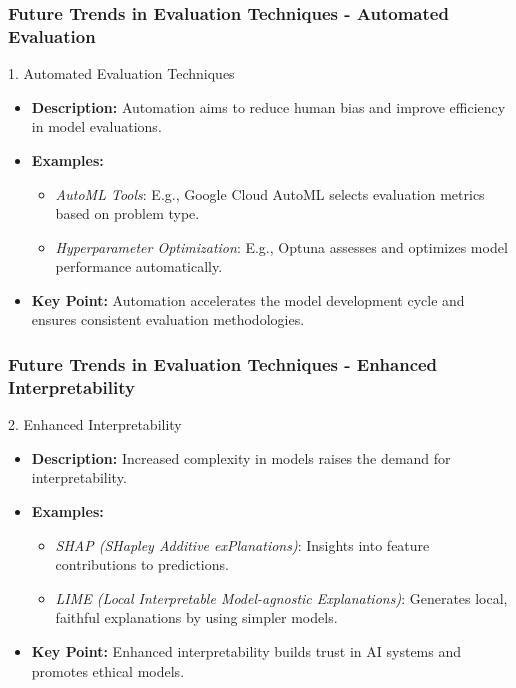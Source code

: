 \documentclass[aspectratio=169]{beamer}
\begin{document}
\begin{frame}[fragile]
    \frametitle{Future Trends in Evaluation Techniques - Automated Evaluation}
    \begin{block}{1. Automated Evaluation Techniques}
        \begin{itemize}
            \item \textbf{Description:} Automation aims to reduce human bias and improve efficiency in model evaluations.
            \item \textbf{Examples:}
            \begin{itemize}
                \item \textit{AutoML Tools}: E.g., Google Cloud AutoML selects evaluation metrics based on problem type.
                \item \textit{Hyperparameter Optimization}: E.g., Optuna assesses and optimizes model performance automatically.
            \end{itemize}
            \item \textbf{Key Point:} Automation accelerates the model development cycle and ensures consistent evaluation methodologies.
        \end{itemize}
    \end{block}
\end{frame}

\begin{frame}[fragile]
    \frametitle{Future Trends in Evaluation Techniques - Enhanced Interpretability}
    \begin{block}{2. Enhanced Interpretability}
        \begin{itemize}
            \item \textbf{Description:} Increased complexity in models raises the demand for interpretability.
            \item \textbf{Examples:}
            \begin{itemize}
                \item \textit{SHAP (SHapley Additive exPlanations)}: Insights into feature contributions to predictions.
                \item \textit{LIME (Local Interpretable Model-agnostic Explanations)}: Generates local, faithful explanations by using simpler models.
            \end{itemize}
            \item \textbf{Key Point:} Enhanced interpretability builds trust in AI systems and promotes ethical models.
        \end{itemize}
    \end{block}
\end{frame}
\end{document}
